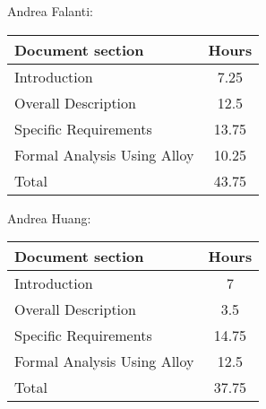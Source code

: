 Andrea Falanti:

\begin{tabular}{|l|c|}
    \hline
    Document section & Hours \\
    \hline
     Introduction & 7.25\\
     Overall Description & 12.5\\
     Specific Requirements & 13.75\\
     Formal Analysis Using Alloy & 10.25\\
     \hline
     Total & 43.75\\
     \hline
\end{tabular}
\vskip 0.3in

Andrea Huang:

\begin{tabular}{|l|c|}
    \hline
    Document section & Hours \\
    \hline
     Introduction &  7\\
     Overall Description & 3.5\\
     Specific Requirements & 14.75\\
     Formal Analysis Using Alloy & 12.5\\
     \hline
     Total & 37.75\\
     \hline
\end{tabular}